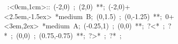 \hbox{
\xy    <1cm,0cm>:<0cm,1cm>::
       (-2,0) ; (2,0) **\dir{-}; (-2,0)+<2.5em,-1.5ex> *{\hbox{medium B}};
       (0,1.5) ; (0,-1.25) **\dir{--}; 0+<3em,2ex> *{\hbox{medium A}};
       (-0.25,1) ; (0,0) **\dir{-};   ?<* \dir{>};  ?* \dir{>};
       (0,0) ; (0.75,-0.75) **\dir{-}; ?>* \dir{>};  ?* \dir{>};
       \endxy}
